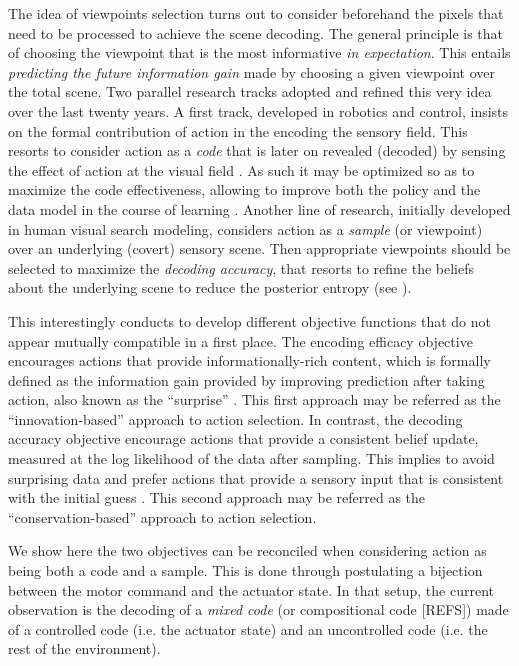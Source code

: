 \documentclass{article}
\begin{document}
The idea of viewpoints selection turns out to consider beforehand the pixels that need to be processed to achieve the scene decoding. The general principle is that of
choosing the viewpoint that is the most {\color{blue} informative} \emph{in expectation}. This entails \emph{predicting the future {\color{blue} information gain}} made by choosing a given viewpoint over the total scene. Two parallel research tracks adopted and refined this very idea over the last twenty years. A first track, developed in robotics and control, insists on the formal contribution of action in the encoding the sensory field. This resorts to consider action as a \emph{code} that is later on revealed (decoded) by sensing the effect of action at the visual field \citep{klyubin2005empowerment,tishby2011information}. As such it may be optimized so as to maximize the code effectiveness, allowing to improve both the policy and the data model in the course of learning \citep{schmidhuber2007simple,mohamed2015variational,houthooft2016vime}. Another line of research, initially developed in human visual search modeling, considers action as a \emph{sample} (or viewpoint) over an underlying (covert) sensory scene. Then appropriate viewpoints should be selected to maximize the \emph{decoding accuracy}, that resorts to refine the beliefs about the underlying scene to reduce the posterior entropy (see \cite{najemnik2005optimal,najemnik2009simple,butko2010infomax,friston2012perceptions}).
  
This interestingly conducts to develop different objective functions that do not appear mutually compatible in a first place. The encoding efficacy objective encourages actions that provide informationally-rich content, which is formally defined as the information gain provided by improving prediction after taking action, also known as the ``surprise'' \cite{itti2005bayesian}. This first approach may be referred as the ``innovation-based'' approach to action selection. In contrast, the decoding accuracy objective encourage actions that provide a consistent belief update, measured at the log likelihood of the data after sampling. This implies to avoid surprising data and prefer actions that provide a sensory input that is consistent with the initial guess \cite{friston2010free}. This second approach may be referred as the ``conservation-based'' approach to action selection.  

We show here the two objectives can be reconciled when considering action as being both a code and a sample. This is done through postulating a bijection between the motor command and the actuator state.
In that setup, the current observation is the decoding of a \emph{mixed code} (or compositional code {\color{blue}[REFS]}) made of a controlled code (i.e. the actuator state) and an uncontrolled code (i.e. the rest of the environment).
\end{document}

